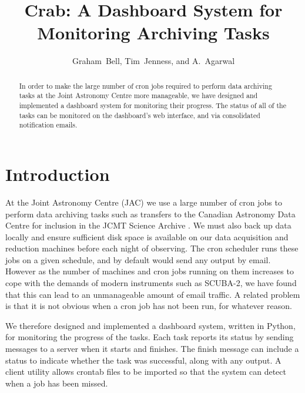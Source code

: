 
\resetcounters




\title{Crab: A Dashboard System for Monitoring Archiving Tasks}
\author{Graham~Bell, Tim~Jenness, and A.~Agarwal
}


\begin{abstract}
In order to make the large number of cron jobs required to perform data archiving tasks at the Joint Astronomy Centre more manageable, we have designed and implemented a dashboard system for monitoring their progress. The status of all of the tasks can be monitored on the dashboard's web interface, and via consolidated notification emails.
\end{abstract}

\section{Introduction}
At the Joint Astronomy Centre (JAC) we use a large number of cron jobs to perform data archiving tasks such as transfers to the Canadian Astronomy Data Centre for inclusion in the JCMT Science Archive \citep{2011ASPC..442..203E}. We must also back up data locally and ensure sufficient disk space is available on our data acquisition and reduction machines before each night of observing. The cron scheduler runs these jobs on a given schedule, and by default would send any output by email. However as the number of machines and cron jobs running on them increases to cope with the demands of modern instruments such as SCUBA-2, we have found that this can lead to an unmanageable amount of email traffic. A related problem is that it is not obvious when a cron job has not been run, for whatever reason.

We therefore designed and implemented a dashboard system, written in Python, for monitoring the progress of the tasks. Each task reports its status by sending messages to a server when it starts and finishes. The finish message can include a status to indicate whether the task was successful, along with any output.  A client utility allows crontab files to be imported so that the system can detect when a job has been missed.


